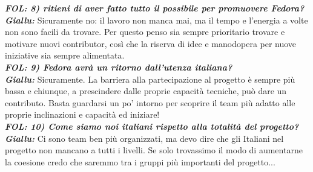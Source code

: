 \emph{\textbf{FOL: 8) ritieni di aver fatto tutto il possibile per promuovere Fedora?}}\\
\emph{\textbf{Giallu: }}Sicuramente no:  il lavoro non manca mai, ma il tempo e l'energia a volte non sono facili da trovare. Per questo penso sia sempre prioritario trovare e motivare nuovi contributor, così che la riserva di idee e manodopera per nuove iniziative sia sempre alimentata.\\

\emph{\textbf{FOL: 9) Fedora avrà un ritorno dall'utenza italiana?}}\\
\emph{\textbf{Giallu: }}Sicuramente. La barriera alla partecipazione al progetto è sempre più bassa e chiunque, a prescindere dalle proprie capacità tecniche, può dare un contributo. Basta guardarsi un po' intorno per scoprire il team più adatto alle proprie inclinazioni e capacità ed iniziare!\\

\emph{\textbf{FOL: 10) Come siamo noi italiani rispetto alla totalità del progetto?}}\\
\emph{\textbf{Giallu: }}Ci sono team ben più organizzati, ma devo dire che gli Italiani nel progetto non mancano a tutti i livelli. Se solo trovassimo il modo di aumentarne la coesione credo che saremmo tra i gruppi più importanti del progetto...
\\
